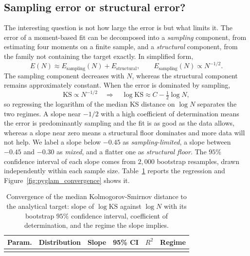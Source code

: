 \subsection{Sampling error or structural error?}\label{subsec:regimes}

The interesting question is not how large the error is but what limits it. The
error of a moment-based fit can be decomposed into a \emph{sampling} component,
from estimating four moments on a finite sample, and a \emph{structural}
component, from the family not containing the target exactly. In simplified form,
\begin{equation}
    E(N) \approx E_{\mathrm{sampling}}(N) + E_{\mathrm{structural}},
    \qquad
    E_{\mathrm{sampling}}(N) \propto N^{-1/2}.
    \label{eq:decomposition}
\end{equation}
The sampling component decreases with $N$, whereas the structural component
remains approximately constant. When the error is dominated by sampling,
\begin{equation}
    \mathrm{KS} \propto N^{-1/2}
    \quad \Longrightarrow \quad
    \log \mathrm{KS} \approx C - \tfrac{1}{2}\log N,
\end{equation}
so regressing the logarithm of the median KS distance on $\log N$ separates the
two regimes. A slope near $-1/2$ with a high coefficient of determination means
the error is predominantly sampling and the fit is as good as the data allows,
whereas a slope near zero means a structural floor dominates and more data will
not help. We label a slope below $-0.45$ as \emph{sampling-limited}, a slope
between $-0.45$ and $-0.30$ as \emph{mixed}, and a flatter one as
\emph{structural floor}. The $95\%$ confidence interval of each slope comes from
$2{,}000$ bootstrap resamples, drawn independently within each sample size.
Table~\ref{tab:rates} reports the regression and
Figure~\ref{fig:pyglam_convergence} shows it.

\begin{table}[htbp]
\centering
\caption{Convergence of the median Kolmogorov-Smirnov distance to the analytical
target: slope of $\log \mathrm{KS}$ against $\log N$ with its bootstrap $95\%$
confidence interval, coefficient of determination, and the regime the slope
implies.}
\label{tab:rates}
\small
\begin{tabular}{llrcrl}
\toprule
\textbf{Param.} & \textbf{Distribution} & \textbf{Slope} & \textbf{95\% CI} &
\textbf{$R^2$} & \textbf{Regime} \\
\midrule
\unskip \\
\bottomrule
\end{tabular}
\end{table}

